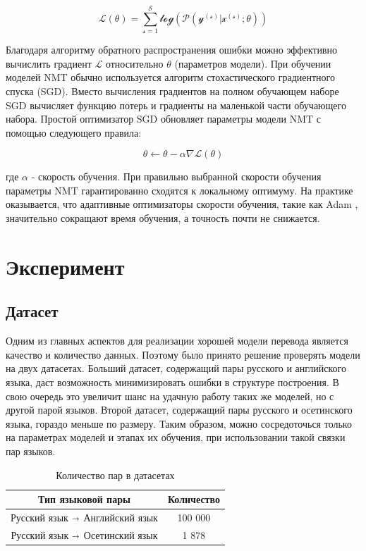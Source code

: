 \documentclass[a4paper,12pt]{article}
\begin{document}
    $$
      \mathscr{L(\theta)=\sum_{s=1}^S log(P(y^{(s)}|x^{(s)};\theta))}  
    $$
    
    Благодаря алгоритму обратного распространения ошибки можно эффективно вычислить градиент $\mathscr{L}$ относительно $\theta$ (параметров модели). При обучении моделей NMT обычно используется алгоритм стохастического градиентного спуска (SGD). Вместо вычисления градиентов на полном обучающем наборе SGD вычисляет функцию потерь и градиенты на маленькой части обучающего набора. Простой оптимизатор SGD обновляет параметры модели NMT с помощью следующего правила:
    
    $$
        \theta \leftarrow \theta - \alpha \nabla \mathscr{L}(\theta)
    $$
    
    где $\alpha$ - скорость обучения. При правильно выбранной скорости обучения параметры NMT гарантированно сходятся к локальному оптимуму. На практике оказывается, что адаптивные оптимизаторы скорости обучения, такие как Adam \cite{8}, значительно сокращают время обучения, а точность почти не снижается.
	
	\section*{Эксперимент}
	
	\subsection*{Датасет}
	
	Одним из главных аспектов для реализации хорошей модели перевода является качество и количество данных. Поэтому было принято решение проверять модели на двух датасетах. Больший датасет, содержащий пары русского и английского языка, даст возможность минимизировать ошибки в структуре построения. В свою очередь это увеличит шанс на удачную работу таких же моделей, но с другой парой языков. Второй датасет, содержащий пары русского и осетинского языка, гораздо меньше по размеру. Таким образом, можно сосредоточься только на параметрах моделей и этапах их обучения, при использовании такой связки пар языков.
    
    \begin{table}[h]
        \centering
        \begin{tabular}{|c|c|} 
        \hline
        \textbf{Тип языковой пары}                                       & \textbf{Количество}  \\ 
        \hline
        Русский язык $\shortrightarrow$ Английский язык & 100 000              \\ 
        \hline
        Русский язык $\shortrightarrow$ Осетинский язык & 1 878                \\
        \hline
        \end{tabular}
        \caption{Количество пар в датасетах}
    \end{table}
    
\end{document}
